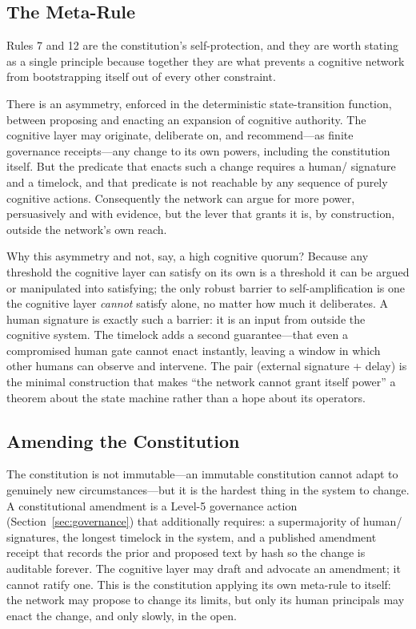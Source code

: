 \subsection{The Meta-Rule}

Rules 7 and 12 are the constitution's self-protection, and they are worth stating as a single principle because together they are what prevents a cognitive network from bootstrapping itself out of every other constraint.

\begin{principle}
\label{prin:metarule}
There is an asymmetry, enforced in the deterministic state-transition function, between proposing and enacting an expansion of cognitive authority. The cognitive layer may originate, deliberate on, and recommend---as finite governance receipts---any change to its own powers, including the constitution itself. But the predicate that enacts such a change requires a human/\DAO{} signature and a timelock, and that predicate is not reachable by any sequence of purely cognitive actions. Consequently the network can argue for more power, persuasively and with evidence, but the lever that grants it is, by construction, outside the network's own reach.
\end{principle}

Why this asymmetry and not, say, a high cognitive quorum? Because any threshold the cognitive layer can satisfy on its own is a threshold it can be argued or manipulated into satisfying; the only robust barrier to self-amplification is one the cognitive layer \emph{cannot} satisfy alone, no matter how much it deliberates. A human signature is exactly such a barrier: it is an input from outside the cognitive system. The timelock adds a second guarantee---that even a compromised human gate cannot enact instantly, leaving a window in which other humans can observe and intervene. The pair (external signature + delay) is the minimal construction that makes ``the network cannot grant itself power'' a theorem about the state machine rather than a hope about its operators.

\subsection{Amending the Constitution}

The constitution is not immutable---an immutable constitution cannot adapt to genuinely new circumstances---but it is the hardest thing in the system to change. A constitutional amendment is a Level-5 governance action (Section~\ref{sec:governance}) that additionally requires: a supermajority of human/\DAO{} signatures, the longest timelock in the system, and a published amendment receipt that records the prior and proposed text by hash so the change is auditable forever. The cognitive layer may draft and advocate an amendment; it cannot ratify one. This is the constitution applying its own meta-rule to itself: the network may propose to change its limits, but only its human principals may enact the change, and only slowly, in the open.

